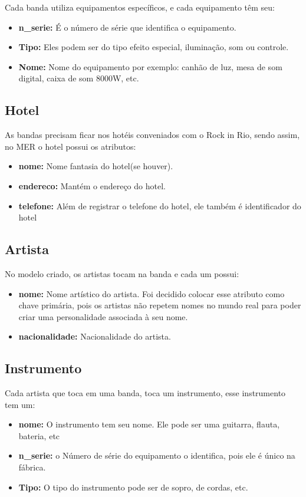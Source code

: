 \documentclass[12pt]{article}
\begin{document}
Cada banda utiliza equipamentos específicos, e cada equipamento têm seu:
\begin{itemize}
\item \textbf{n\_serie:} É o número de série que identifica o equipamento.
\item \textbf{Tipo:} Eles podem ser do tipo efeito especial, iluminação, som ou controle.
\item \textbf{Nome:} Nome do equipamento por exemplo: canhão de luz, mesa de som digital, caixa de som 8000W, etc.
\end{itemize}

\subsection{Hotel}

As bandas precisam ficar nos hotéis conveniados com o Rock in Rio, sendo assim, no MER o hotel possui os atributos:
\begin{itemize}
	\item \textbf{nome:} Nome fantasia do hotel(se houver).
	\item \textbf{endereco:} Mantém o endereço do hotel.
	\item \textbf{telefone:} Além de registrar o telefone do hotel, 		ele também é identificador do hotel
\end{itemize}
\subsection{Artista}

No modelo criado, os artistas tocam na banda e cada um possui:

\begin{itemize}
	\item \textbf{nome:} Nome artístico do artista. Foi decidido colocar esse atributo como chave primária, pois os artistas não repetem nomes no mundo real para poder criar uma personalidade associada à seu nome.
	\item \textbf{nacionalidade:} Nacionalidade do artista.
\end{itemize}
\subsection{Instrumento}

Cada artista que toca em uma banda, toca um instrumento, esse instrumento tem um:
\begin{itemize}
	\item \textbf{nome:} O instrumento tem seu nome. Ele pode ser uma guitarra, flauta, bateria, etc
	\item \textbf{n\_serie:} o Número de série do equipamento o identifica, pois ele é único na fábrica.
	\item \textbf{Tipo:} O tipo do instrumento pode ser de sopro, de cordas, etc.
\end{itemize}
\end{document}
